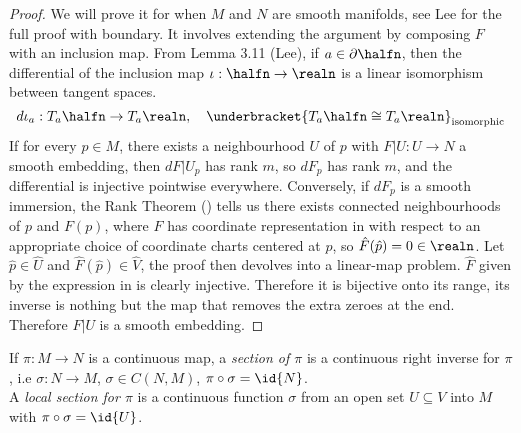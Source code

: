 \documentclass[../main-v2-manifolds.tex]{subfiles}
\begin{document}
\begin{proof}
    We will prove it for when $M$ and $N$ are smooth manifolds, see Lee for the full proof with boundary. It involves extending the argument by composing $F$ with an inclusion map. From Lemma 3.11 (Lee), if $a\in \partial\halfn$, then the differential of the inclusion map $\iota:\halfn\to\realn$ is a linear isomorphism between tangent spaces.
    \[
        d\iota_a:T_a\halfn\to T_a\realn,\quad \underbracket{T_a\halfn\cong T_a\realn}_{\text{isomorphic}}
    \]
    If for every $p\in M$, there exists a neighbourhood $U$ of $p$ with $F|U: U\to N$ a smooth embedding, then $dF|U_p$ has rank $m$, so $dF_p$ has rank $m$, and the differential is injective pointwise everywhere. Conversely, if $dF_p$ is a smooth immersion, the Rank Theorem () tells us there exists connected neighbourhoods of $p$ and $F(p)$, where $F$ has coordinate representation in  with respect to an appropriate choice of coordinate charts centered at $p$, so $\hat{F}(\hat{p})=0\in\realn$. Let $\hat{p}\in \hat{U}$ and $\hat{F}(\hat{p})\in \hat{V}$, the proof then devolves into a linear-map problem. $\hat{F}$ given by the expression in  is clearly injective. Therefore it is bijective onto its range, its inverse is nothing but the map that removes the extra zeroes at the end. Therefore $F|U$ is a smooth embedding.
\end{proof}
\begin{definition}[Section of $\pi: M\to N$]\label{lee-chp4:section-of-continuous-map}
   If $\pi: M\to N$ is a continuous map, a \emph{section of $\pi$} is a continuous right inverse for $\pi$, i.e $\sigma:N\to M$, $\sigma\in C(N,M)$, $\pi\circ\sigma=\id{N}$.\\

   A \emph{local section for $\pi$} is a continuous function $\sigma$ from an open set $U\subseteq V$ into $M$ with $\pi\circ\sigma=\id{U}$. 
\end{definition}
\end{document}
